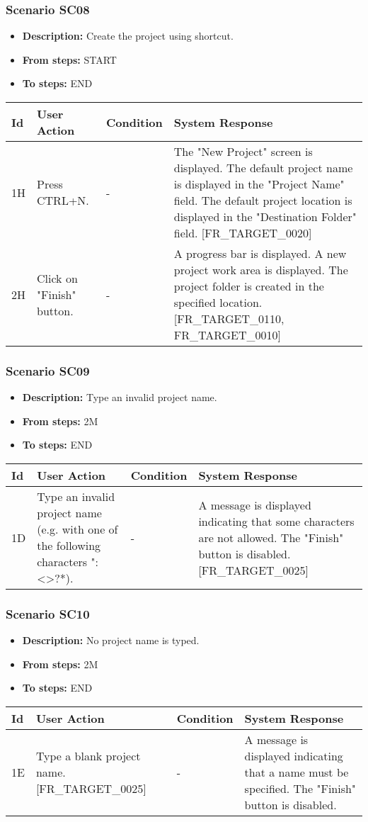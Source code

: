 \documentclass[a4paper,11pt]{article}
\newcommand{\bl}{\\ \hline}
\begin{document}
\subsubsection*{Scenario SC08}
\begin{itemize}
\item {\bf Description:} Create the project using shortcut.
\item {\bf From steps:} START
\item {\bf To steps:} END
\end{itemize}
\begin{tabular}{|p{0.4in}|p{1.5in}|p{1.5in}|p{1.5in}|}
\hline
Id & User Action & Condition & System Response \bl 
1H & Press CTRL+N. & - & The "New Project" screen is displayed. The default
						project name is displayed in the "Project Name" field. The default
						project location is displayed in the "Destination Folder" field.
						[FR_TARGET_0020]\bl
2H & Click on "Finish" button. & - & A progress bar is displayed. A new project work area is
						displayed. The project folder is created in the specified
						location. [FR_TARGET_0110, FR_TARGET_0010]\bl
\end{tabular}
\subsubsection*{Scenario SC09}
\begin{itemize}
\item {\bf Description:} Type an invalid project name.
\item {\bf From steps:} 2M
\item {\bf To steps:} END
\end{itemize}
\begin{tabular}{|p{0.4in}|p{1.5in}|p{1.5in}|p{1.5in}|}
\hline
Id & User Action & Condition & System Response \bl 
1D & Type an invalid project name (e.g. with one of the
						following characters ":\/<>?*). & - & A message is displayed indicating that some characters
						are not allowed. The "Finish" button is disabled. [FR_TARGET_0025]
					\bl
\end{tabular}
\subsubsection*{Scenario SC10}
\begin{itemize}
\item {\bf Description:} No project name is typed.
\item {\bf From steps:} 2M
\item {\bf To steps:} END
\end{itemize}
\begin{tabular}{|p{0.4in}|p{1.5in}|p{1.5in}|p{1.5in}|}
\hline
Id & User Action & Condition & System Response \bl 
1E & Type a blank project name. [FR_TARGET_0025] & - & A message is displayed indicating that a name must be
						specified. The "Finish" button is disabled. \bl
\end{tabular}
\end{document}

